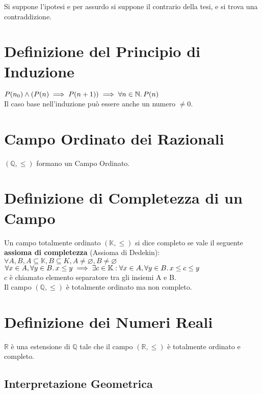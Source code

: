 \documentclass[a4paper, twoside, italian, 11pt]{book}
\newcommand{\N}{\mathbb{N}}
\newcommand{\Q}{\mathbb{Q}}
\newcommand{\K}{\mathbb{K}}
\newcommand{\R}{\mathbb{R}}
\let\emptyset\varnothing
\begin{document}
\noindent
Si suppone l'ipotesi e per assurdo si suppone il contrario della tesi, e si trova una contraddizione.



\section{Definizione del Principio di Induzione}

\indent
$P(n_0) \land (P(n) \implies P(n + 1)) \implies \forall n \in \N \ldotp P(n)$ \\

\noindent
Il caso base nell'induzione può essere anche un numero $\neq 0$.



\section{Campo Ordinato dei Razionali}
\noindent
$(\Q, \leq)$ formano un Campo Ordinato.


\section{Definizione di Completezza di un Campo}

\noindent
Un campo totalmente ordinato $(\K, \leq)$ si dice completo se vale il seguente \textbf{assioma di completezza} (Assioma di Dedekin): \\

$\forall A, B, A \subseteq \K, B \subseteq K, A \neq \emptyset, B \neq \emptyset$ \\

$\forall x \in A, \forall y \in B \ldotp x \leq y \implies \exists c \in \K : \forall x \in A, \forall y \in B \ldotp x \leq c \leq y$ \\

\noindent
$c$ è chiamato elemento separatore tra gli insiemi A e B. \\

\noindent
Il campo $(\Q, \leq)$ è totalmente ordinato ma non completo.


\section{Definizione dei Numeri Reali}

\noindent
$\R$ è una estensione di $\Q$ tale che il campo $(\R, \leq)$ è totalmente ordinato e completo.


\subsection{Interpretazione Geometrica}
\end{document}

